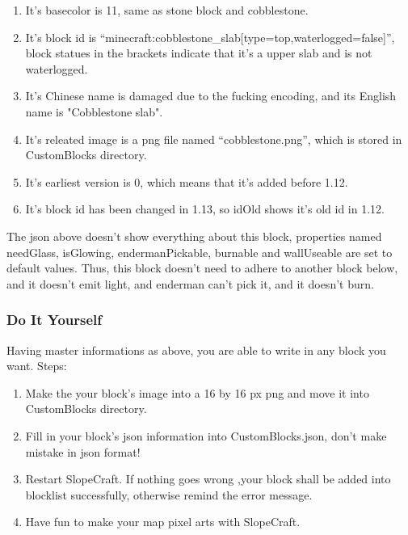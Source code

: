 \documentclass{article}
\begin{document}
\begin{enumerate}
    \item It's basecolor is 11, same as stone block and cobblestone.

    \item It's block id is “minecraft:cobblestone\_slab[type=top,waterlogged=false]”, block statues in the brackets indicate that it's a upper slab and is not waterlogged.

    \item It's Chinese name is damaged due to the fucking encoding, and its English name is "Cobblestone slab".

    \item It's releated image is a png file named “cobblestone.png”, which is stored in CustomBlocks directory.

    \item It's earliest version is 0, which means that it's added before 1.12.

    \item It's block id has been changed in 1.13, so idOld shows it's old id in 1.12.

\end{enumerate}

The json above doesn't show everything about this block, properties named needGlass, isGlowing, endermanPickable, burnable and wallUseable are set to default values. Thus, this block doesn't need to adhere to another block below, and it doesn't emit light, and enderman can't pick it, and it doesn't burn.

\subsubsection{Do It Yourself}
Having master informations as above, you are able to write in any block you want. Steps:

\begin{enumerate}
    \item Make the your block's image into a 16 by 16 px png and move it into CustomBlocks directory.
    \item Fill in your block's json information into CustomBlocks.json, don't make mistake in json format!
    \item Restart SlopeCraft. If nothing goes wrong ,your block shall be added into blocklist successfully, otherwise remind the error message.
    \item Have fun to make your map pixel arts with SlopeCraft.
\end{enumerate}
\end{document}
